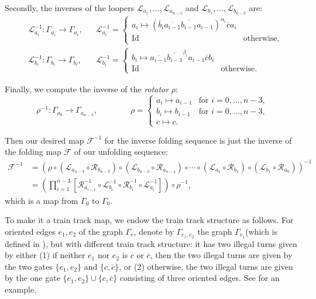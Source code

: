 \documentclass[11pt, letterpaper]{amsart}
\theoremstyle{plain}
\theoremstyle{definition}
\newcommand{\G}{\Gamma}
\newcommand{\cL}{\mathcal{L}}
\newcommand{\cR}{\mathcal{R}}
\newcommand{\calF}{\mathcal{F}}
\newcommand{\ov}[1]{\overline{#1}}
\begin{document}
Secondly, the inverses of the loopers $\cL_{a_1},\ldots,\cL_{a_{n-3}}$ and $\cL_{b_1},\ldots,\cL_{b_{n-3}}$ are:
\begin{align*}
    &\cL_{a_i}^{-1}: \G_{a_i} \to \G_{a_i},
    &&\cL_{a_i}^{-1} =
    \begin{cases}
        a_i \mapsto (\ov{b}_i\ov{a_{i-1}}\ov{b_{i-1}}a_{i-1})^{\alpha_i}\ov{c}a_i \\
    \text{Id} & \text{otherwise},
    \end{cases}\\
    &\cL_{b_i}^{-1}: \G_{b_i} \to \G_{b_i},
    &&\cL_{b_i}^{-1} =
    \begin{cases}
        b_i \mapsto \ov{a_{i-1}}\ov{b_{i-1}}^{\beta_i}a_{i-1}\ov{c}b_i \\
        \text{Id} & \text{otherwise}.
    \end{cases}
\end{align*}

Finally, we compute the inverse of the \emph{rotator} $\rho$:
\[
    \rho^{-1}: \G_{a_0} \to \G_{a_{n-3}},
    \qquad \qquad
    \rho =
    \begin{cases}
        a_i \mapsto a_{i-1} & \text{for $i=0,\ldots,n-3$,}\\
        b_i \mapsto b_{i-1} & \text{for $i=0,\ldots,n-3$,}\\
        c \mapsto c.
    \end{cases}
\]

Then our desired map $\calF^{-1}$ for the inverse folding sequence is just the inverse of the folding map $\calF$ of our unfolding sequence:
    \begin{align*}
        \calF^{-1} &= \left(\rho \circ (\cL_{a_{n-3}} \circ \cR_{b_{n-3}})\circ (\cL_{b_{n-3}} \circ \cR_{a_{n-4}}) \circ \cdots \circ (\cL_{a_1} \circ \cR_{b_1}) \circ (\cL_{b_1} \circ \cR_{a_0})\right)^{-1}\\
        &= \left(\prod_{i=1}^{n-3}[\cR_{a_{i-1}}^{-1} \circ \cL_{b_i}^{-1} \circ \cR_{b_i}^{-1} \circ \cL_{a_{i}}^{-1}] \right) \circ \rho^{-1},
    \end{align*}
    which is a map from $\G_0$ to $\G_0$.

To make it a train track map, we endow the train track structure as follows. For
oriented edges $e_1,e_2$ of the graph $\G_e$, denote by $\G_{e_1,e_2}$ the graph
$\G_{e_1}$(which is defined in ), but with different
train track structure: it has two illegal turns given by either (1) if neither
$e_1$ nor $e_2$ is $c$ or $\ov{c}$, then the two illegal turns are given by the
two gates $\{e_1,e_2\}$ and $\{c,\ov{c}\}$, or (2) otherwise, the two illegal turns are given by the one gate
$\{e_1,e_2\} \cup \{c, \ov{c}\}$ consisting of three oriented edges. See
 for an example.
\end{document}
